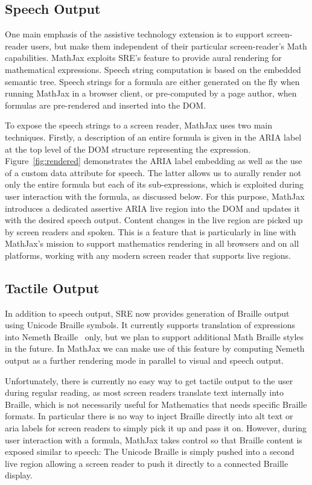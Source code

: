 \documentclass{sig-alternate}
\begin{document}
\subsection{Speech Output}

One main emphasis of the assistive technology extension is to support
screen-reader users, but make them independent of their particular
screen-reader's Math capabilities. MathJax exploits SRE's feature to provide
aural rendering for mathematical expressions. Speech string computation is based
on the embedded semantic tree. Speech strings for a formula are either generated
on the fly when running MathJax in a browser client, or pre-computed by a page
author, when formulas are pre-rendered and inserted into the DOM.

To expose the speech strings to a screen reader, MathJax uses two main
techniques.  Firstly, a description of an entire formula is given in the ARIA
label at the top level of the DOM structure representing the expression.
Figure~\ref{fig:rendered} demonstrates the ARIA label embedding as well as the
use of a custom data attribute for speech. The latter allows us to aurally
render not only the entire formula but each of its sub-expressions, which is
exploited during user interaction with the formula, as discussed below.  For
this purpose, MathJax introduces a dedicated assertive ARIA live region into the
DOM and updates it with the desired speech output. Content changes in the live region
are picked up by screen readers and spoken. This is a feature that is
particularly in line with MathJax's mission to support mathematics
rendering in all browsers and on all platforms, working with any modern screen
reader that supports live regions.


\subsection{Tactile Output}

In addition to speech output, SRE now provides generation of Braille
output using Unicode Braille symbols. It currently supports translation of
expressions into Nemeth Braille~\cite{nemeth1972nemeth} only, but we plan to support
additional Math Braille styles in the future. In MathJax we can make use of this
feature by computing Nemeth output as a further rendering mode in parallel to
visual and speech output.

Unfortunately, there is currently no easy way to get tactile output to the user
during regular reading, as most screen readers translate text internally into
Braille, which is not necessarily useful for Mathematics that needs specific
Braille formats. In particular there is no way to inject Braille directly into
alt text or aria labels for screen readers to simply pick it up and pass it on.
However, during user interaction with a formula, MathJax takes control so that
Braille content is exposed similar to speech: The Unicode Braille is simply
pushed into a second live region allowing a screen reader to push it directly to
a connected Braille display.
\end{document}
